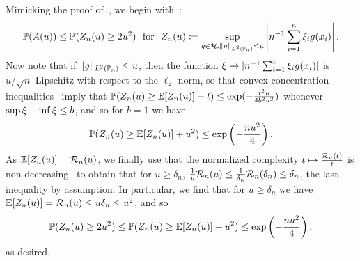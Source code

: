 Mimicking the proof of~\cite[Lemma 13.12]{Wainwright19}, we
begin with~\cite[Eq.~(13.40)]{Wainwright19}:
\begin{equation*}
  \mathbb{P}(A(u))
  \le \mathbb{P}(Z_n(u) \ge 2 u^2)
  ~~ \mbox{for} ~~
  Z_n(u) \coloneqq \sup_{g \in \mathcal{H},
    \|{g}\|_{L^2(\mathbb{P}_n)} \le u} \left|n^{-1} \sum_{i=1}^n \xi_i g(x_i)\right|.
\end{equation*}
Now note that if $\|{g}\|_{L^2(\mathbb{P}_n)} \le u$, then the function $\xi \mapsto
|n^{-1} \sum_{i = 1}^n \xi_i g(x_i)|$ is $u / \sqrt{n}$-Lipschitz
with respect to the $\ell_2$-norm, so that convex concentration
inequalities~\cite[e.g.][Theorem 3.4]{Wainwright19}
imply that
$\mathbb{P}(Z_n(u) \ge \mathbb{E}[Z_n(u)] + t)
\le \exp(-\frac{t^2 n}{4 b^2 u^2})$
whenever $\sup \xi - \inf \xi \le b$, and so
for $b = 1$ we have
\begin{equation*}
  \mathbb{P}(Z_n(u) \ge \mathbb{E}[Z_n(u)] + u^2) \le
  \exp\left(-\frac{n u^2}{4}\right).
\end{equation*}
As $\mathbb{E}[Z_n(u)] = \mathcal{R}_n(u)$, we
finally use that the normalized complexity $t \mapsto
\frac{\mathcal{R}_n(t)}{t}$ is non-decreasing~\cite[Lemma
  13.6]{Wainwright19} to obtain that
for $u \ge \delta_n$,
$\frac{1}{u} \mathcal{R}_n(u)
\le \frac{1}{\delta_n} \mathcal{R}_n(\delta_n)
\le \delta_n$, the last inequality by assumption.
In particular, we find that for $u \ge \delta_n$ we have
$\mathbb{E}[Z_n(u)] = \mathcal{R}_n(u)
\le u \delta_n \le u^2$, and so
\begin{equation*}
  \mathbb{P}(Z_n(u) \ge 2 u^2) \le
  \mathbb{P}(Z_n(u) \ge \mathbb{E}[Z_n(u)] + u^2)
  \le \exp\left(-\frac{n u^2}{4} \right),
\end{equation*}
as desired.
